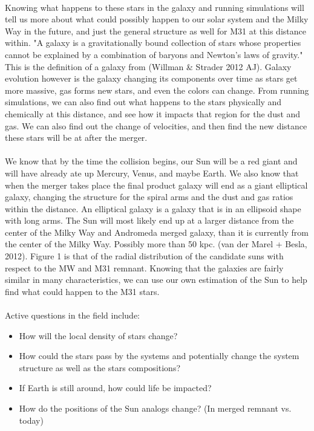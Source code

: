 \documentclass[fleqn,usenatbib]{mnras}
\begin{document}
\paragraph{}
Knowing what happens to these stars in the galaxy and running simulations will tell us more about what could possibly happen to our solar system and the Milky Way in the future, and just the general structure as well for M31 at this distance within. 
"A galaxy is a gravitationally bound collection of stars whose
properties cannot be explained by a combination of baryons and
Newton’s laws of gravity."
This is the definition of a galaxy from (Willman \& Strader 2012 AJ). 
Galaxy evolution however is the galaxy changing its components over time as stars get more massive, gas forms new stars, and even the colors can change. 
From running simulations, we can also find out what happens to the stars physically and chemically at this distance, and see how it impacts that region for the dust and gas. We can also find out the change of velocities, and then find the new distance these stars will be at after the merger.

\paragraph{}
We know that by the time the collision begins, our Sun will be a red giant and will have already ate up Mercury, Venus, and maybe Earth. We also know that when the merger takes place the final product galaxy will end as a giant elliptical galaxy, changing the structure for the spiral arms and the dust and gas ratios within the distance. 
An elliptical galaxy is a galaxy that is in an ellipsoid shape with long arms. The Sun will most likely end up at a larger distance from the center of the Milky Way and Andromeda merged galaxy, than it is currently from the center of the Milky Way. Possibly more than 50 kpc.
(van der Marel + Besla, 2012).
Figure 1 is that of the radial distribution of the candidate suns with respect to the MW and M31 remnant. 
Knowing that the galaxies are fairly similar in many characteristics, we can use our own estimation of the Sun to help find what could happen to the M31 stars. 

\paragraph{}
Active questions in the field include:
\begin{itemize}
  \item How will the local density of stars change? 
  \item How could the stars pass by the systems and potentially change the system structure as well as the stars compositions?
  \item If Earth is still around, how could life be impacted?
  \item How do the positions of the Sun analogs change? (In merged remnant vs. today)
\end{itemize}
\end{document}
